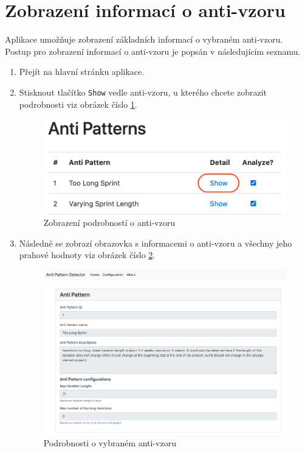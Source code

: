 \documentclass[czech,DP]{thesiskiv}
\begin{document}
\section{Zobrazení informací o anti-vzoru}
Aplikace umožňuje zobrazení základních informací o vybraném anti-vzoru. Postup pro zobrazení informací o anti-vzoru je popsán v následujícím seznamu.
\begin{enumerate}
    \item Přejít na hlavní stránku aplikace.
    \item Stisknout tlačítko \texttt{Show} vedle anti-vzoru, u kterého chcete zobrazit podrobnosti viz obrázek číslo \ref{img:user_screen_8}.
\begin{figure}[!htb]
    \centering
    \includegraphics[width=300pt]{img/user_screen_8.png}
    \caption{Zobrazení podrobností o anti-vzoru}
    \label{img:user_screen_8}
\end{figure}
\FloatBarrier
    \item Následně se zobrazí obrazovka s informacemi o anti-vzoru a všechny jeho prahové hodnoty viz obrázek číslo \ref{img:user_screen_9}.
\begin{figure}[!htb]
    \centering
    \includegraphics[width=400pt]{img/user_screen_9.png}
    \caption{Podrobnosti o vybraném anti-vzoru}
    \label{img:user_screen_9}
\end{figure}
\FloatBarrier
\end{enumerate}
\end{document}
